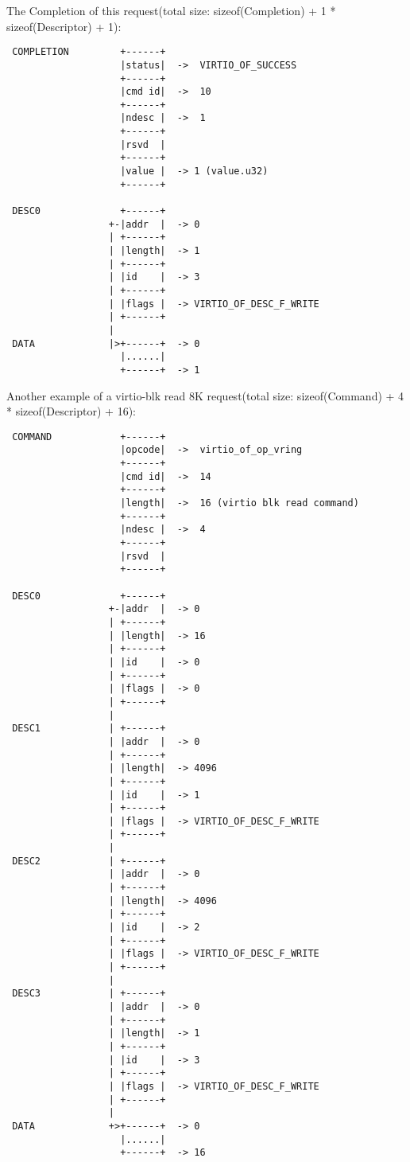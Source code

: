 The Completion of this request(total size: sizeof(Completion) + 1 * sizeof(Descriptor) + 1):
\begin{lstlisting}
 COMPLETION         +------+
                    |status|  ->  VIRTIO_OF_SUCCESS
                    +------+
                    |cmd id|  ->  10
                    +------+
                    |ndesc |  ->  1
                    +------+
                    |rsvd  |
                    +------+
                    |value |  -> 1 (value.u32)
                    +------+

 DESC0              +------+
                  +-|addr  |  -> 0
                  | +------+
                  | |length|  -> 1
                  | +------+
                  | |id    |  -> 3
                  | +------+
                  | |flags |  -> VIRTIO_OF_DESC_F_WRITE
                  | +------+
                  |
 DATA             |>+------+  -> 0
                    |......|
                    +------+  -> 1
\end{lstlisting}

Another example of a virtio-blk read 8K request(total size: sizeof(Command) + 4 * sizeof(Descriptor) + 16):
\begin{lstlisting}
 COMMAND            +------+
                    |opcode|  ->  virtio_of_op_vring
                    +------+
                    |cmd id|  ->  14
                    +------+
                    |length|  ->  16 (virtio blk read command)
                    +------+
                    |ndesc |  ->  4
                    +------+
                    |rsvd  |
                    +------+

 DESC0              +------+
                  +-|addr  |  -> 0
                  | +------+
                  | |length|  -> 16
                  | +------+
                  | |id    |  -> 0
                  | +------+
                  | |flags |  -> 0
                  | +------+
                  |
 DESC1            | +------+
                  | |addr  |  -> 0
                  | +------+
                  | |length|  -> 4096
                  | +------+
                  | |id    |  -> 1
                  | +------+
                  | |flags |  -> VIRTIO_OF_DESC_F_WRITE
                  | +------+
                  |
 DESC2            | +------+
                  | |addr  |  -> 0
                  | +------+
                  | |length|  -> 4096
                  | +------+
                  | |id    |  -> 2
                  | +------+
                  | |flags |  -> VIRTIO_OF_DESC_F_WRITE
                  | +------+
                  |
 DESC3            | +------+
                  | |addr  |  -> 0
                  | +------+
                  | |length|  -> 1
                  | +------+
                  | |id    |  -> 3
                  | +------+
                  | |flags |  -> VIRTIO_OF_DESC_F_WRITE
                  | +------+
                  |
 DATA             +>+------+  -> 0
                    |......|
                    +------+  -> 16
\end{lstlisting}

